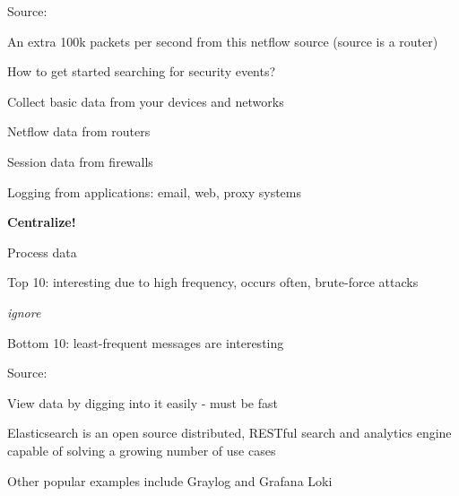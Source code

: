 \documentclass[Screen16to9,17pt]{foils}
\begin{document}
Source: \\{\footnotesize
{}
}







\centerline{An extra 100k packets per second from this netflow source (source is a router)}



\begin{list1}
\item How to get started searching for security events?
\item Collect basic data from your devices and networks
\begin{list2}
\item Netflow data from routers
\item Session data from firewalls
\item Logging from applications: email, web, proxy systems
\end{list2}
\item {\bf Centralize!}
\item Process data
\begin{list2}
\item Top 10: interesting due to high frequency, occurs often, brute-force attacks
\item {\it ignore}
\item Bottom 10: least-frequent messages are interesting
\end{list2}
\end{list1}





Source: 

\begin{list2}
\item View data by digging into it easily - must be fast
\item Elasticsearch is an open source distributed, RESTful search and analytics engine capable of solving a growing number of use cases
\item Other popular examples include Graylog and Grafana Loki
\end{list2}
\end{document}
